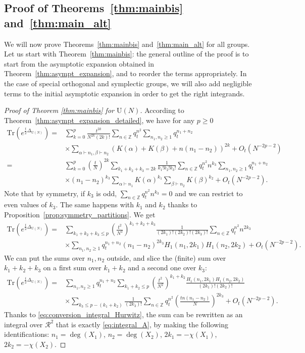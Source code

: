 \documentclass[11pt,a4paper,reqno]{article}
\theoremstyle{definition}
\theoremstyle{remark}
\newcommand\U{{\mathrm U}}
\newcommand\Z{{\mathbb Z}}
\newcommand\Tr{\mathrm{Tr}}
\begin{document}
\subsection{Proof of Theorems~\ref{thm:mainbis} and~\ref{thm:main_alt}}

We will now prove Theorems~\ref{thm:mainbis} and~\ref{thm:main_alt} for all groups. Let us start with Theorem~\ref{thm:mainbis}: the general outline of the proof is to start from the asymptotic expansion obtained in Theorem~\ref{thm:asympt_expansion}, and to reorder the terms appropriately. In the case of special orthogonal and symplectic groups, we will also add negligible terms to the initial asymptotic expansion in order to get the right integrands.

\begin{proof}[Proof of Theorem \ref{thm:mainbis} for $\U(N)$]

According to Theorem~\ref{thm:asympt_expansion_detailed}, we have for any $p\geq 0$
\begin{align*}
\Tr(e^{\frac{t}{2}\Delta_{\U(N)}})= & \sum_{k=0}^p\frac{t^{2k}}{N^{2k}(2k)!}\sum_{n\in\Z}q_t^{n^2}\sum_{n_1,n_2\geq 1} q_t^{n_1+n_2}\\
&\times \sum_{\alpha\vdash n_1,\beta\vdash n_2}(K(\alpha)+K(\beta)+n(n_1-n_2))^{2k}+O_t(N^{-2p-2})\\
= & \sum_{k=0}^p\left(\frac{t}{N}\right)^{2k}\sum_{k_1+k_2+k_3=2k}\frac{1}{k_1!k_2!k_3!}\sum_{n\in\Z}q_t^{n^2}n^{k_3} \sum_{n_1,n_2\geq 1}q_t^{n_1+n_2}\\
& \times (n_1-n_2)^{k_3}\sum_{\alpha\vdash n_1}K(\alpha)^{k_1}\sum_{\beta\vdash n_2}K(\beta)^{k_2}+O_t(N^{-2p-2}).
\end{align*}
Note that by symmetry, if $k_3$ is odd, $\sum_{n\in\Z}q_t^{n^2}n^{k_3}=0$ and we can restrict to even values of $k_3$. The same happens with $k_1$ and $k_2$ thanks to Proposition~\ref{prop:symmetry_partitions}. We get
\begin{align*}
\Tr(e^{\frac{t}{2}\Delta_{\U(N)}})= & \sum_{k_1+k_2+k_3\leq p}\left(\frac{t^2}{N^2}\right)^{k_1+k_2+k_3}\frac{1}{(2k_1)!(2k_2)!(2k_3)!}\sum_{n\in\Z}q_t^{n^2}n^{2k_3} \\
& \times \sum_{n_1,n_2\geq 1}q_t^{n_1+n_2} (n_1-n_2)^{2k_3}H_1(n_1,2k_1)H_1(n_2,2k_2)+O_t(N^{-2p-2}).
\end{align*}
We can put the sums over $n_1,n_2$ outside, and slice the (finite) sum over $k_1+k_2+k_3$ on a first sum over $k_1+k_2$ and a second one over $k_3$:
\begin{align*}
\Tr(e^{\frac{t}{2}\Delta_{\U(N)}})= &\sum_{n_1,n_2\geq 1}q_t^{n_1+n_2} \sum_{k_1+k_2\leq p}\left(\frac{t^2}{N^2}\right)^{k_1+k_2}\frac{H_1(n_1,2k_1)H_1(n_2,2k_2)}{(2k_1)!(2k_2)!}\\
& \times \sum_{k_3\leq p-(k_1+k_2)}\frac{1}{(2k_3)!}\sum_{n\in\Z}q_t^{n^2}\left(\frac{tn(n_1-n_2)}{N}\right)^{2k_3} +O_t(N^{-2p-2}).
\end{align*}
Thanks to \eqref{eq:conversion_integral_Hurwitz}, the sum can be rewritten as an integral over $\mathcal{R}^2$ that is exactly \eqref{eq:integral_A}, by making the following identifications: $n_1=\deg(X_1)$, $n_2=\deg(X_2)$, $2k_1=-\chi(X_1)$, $2k_2=-\chi(X_2)$.
\end{proof}
\end{document}

